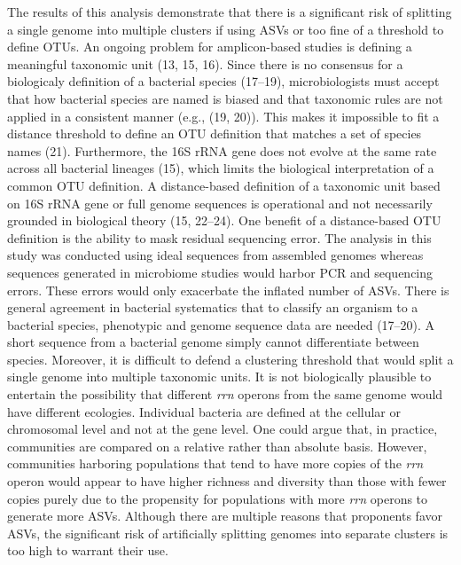 \documentclass[
]{article}
\begin{document}
The results of this analysis demonstrate that there is a significant
risk of splitting a single genome into multiple clusters if using ASVs
or too fine of a threshold to define OTUs. An ongoing problem for
amplicon-based studies is defining a meaningful taxonomic unit (13, 15,
16). Since there is no consensus for a biologicaly definition of a
bacterial species (17--19), microbiologists must accept that how
bacterial species are named is biased and that taxonomic rules are not
applied in a consistent manner (e.g., (19, 20)). This makes it
impossible to fit a distance threshold to define an OTU definition that
matches a set of species names (21). Furthermore, the 16S rRNA gene does
not evolve at the same rate across all bacterial lineages (15), which
limits the biological interpretation of a common OTU definition. A
distance-based definition of a taxonomic unit based on 16S rRNA gene or
full genome sequences is operational and not necessarily grounded in
biological theory (15, 22--24). One benefit of a distance-based OTU
definition is the ability to mask residual sequencing error. The
analysis in this study was conducted using ideal sequences from
assembled genomes whereas sequences generated in microbiome studies
would harbor PCR and sequencing errors. These errors would only
exacerbate the inflated number of ASVs. There is general agreement in
bacterial systematics that to classify an organism to a bacterial
species, phenotypic and genome sequence data are needed (17--20). A
short sequence from a bacterial genome simply cannot differentiate
between species. Moreover, it is difficult to defend a clustering
threshold that would split a single genome into multiple taxonomic
units. It is not biologically plausible to entertain the possibility
that different \emph{rrn} operons from the same genome would have
different ecologies. Individual bacteria are defined at the cellular or
chromosomal level and not at the gene level. One could argue that, in
practice, communities are compared on a relative rather than absolute
basis. However, communities harboring populations that tend to have more
copies of the \emph{rrn} operon would appear to have higher richness and
diversity than those with fewer copies purely due to the propensity for
populations with more \emph{rrn} operons to generate more ASVs. Although
there are multiple reasons that proponents favor ASVs, the significant
risk of artificially splitting genomes into separate clusters is too
high to warrant their use.

\vspace{10mm}
\end{document}
